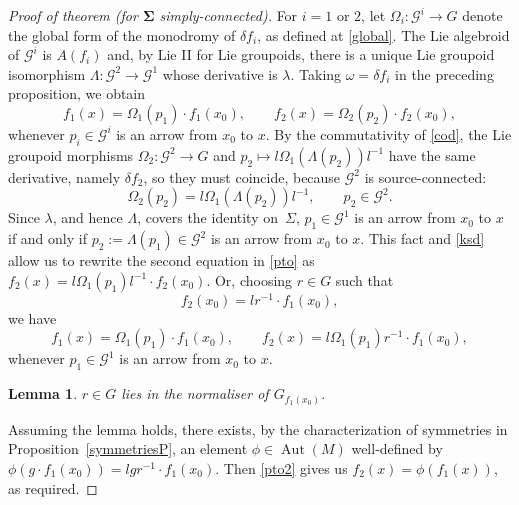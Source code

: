 \documentclass[10pt,a4paper]{amsart}
\numberwithin{equation}{section}
\newtheorem{Lemma}[Theorem]{Lemma}
\DeclareMathOperator{\automorphism}{Aut}
\begin{document}
\begin{proof}[Proof of theorem (for $\boldsymbol{\Sigma}$ simply-connected)]
For $i=1$ or $2$, let $\Omega_i \colon {\mathcal G}^i \rightarrow G$
denote the global form of the monodromy of $\delta f_i$, as defined at
\eqref{global}. The Lie algebroid of ${\mathcal G}^i$ is $A(f_i)$ and,
by Lie II for Lie groupoids, there is a unique Lie groupoid
isomorphism $\Lambda \colon {\mathcal G}^2\rightarrow {\mathcal G}^1$
whose derivative is $\lambda$. Taking $\omega = \delta f_i$ in the
preceding proposition, we obtain
\begin{equation} f_1(x) = \Omega_1(p_1) \cdot f_1(x_0),\qquad f_2(x) =
\Omega_2(p_2) \cdot f_2(x_0), \label{pto}
\end{equation} whenever $p_i \in {\mathcal G}^i$ is an arrow from
$x_0$ to $x$. By the commutativity of \eqref{cod}, the Lie groupoid
morphisms $\Omega_2 \colon {\mathcal G}^2 \rightarrow G$ and $p_2
\mapsto l \Omega_1({\Lambda}(p_2))l^{-1}$ have the same
derivative, namely $\delta f_2$, so they must coincide, because
${\mathcal G}^2$ is source-connected:
\begin{equation}
\Omega_2(p_2) = l\Omega_1({\Lambda}(p_2))l^{-1},\qquad
p_2 \in {\mathcal G}^2.\label{ksd}
\end{equation}
Since $\lambda$, and hence $\Lambda$, covers the
identity on~$\Sigma $, $p_1 \in {\mathcal G}^1$ is an arrow from $x_0$
to $x$ if and only if $p_2:=\Lambda(p_1)\in {\mathcal G}^2$ is an
arrow from $x_0$ to $x$. This fact and \eqref{ksd} allow us to rewrite
the second equation in \eqref{pto} as $f_2(x)=l \Omega_1(p_1)l^{-1}
\cdot f_2(x_0)$. Or, choosing $r \in G$ such that
\begin{equation} f_2(x_0)=lr^{-1}\cdot f_1(x_0),\label{five}
\end{equation} we have
\begin{equation} f_1(x) = \Omega_1(p_1) \cdot f_1(x_0),\qquad f_2(x) =
l\Omega_1(p_1)r^{-1} \cdot f_1(x_0), \label{pto2}
\end{equation} whenever $p_1 \in {\mathcal G}^1$ is an arrow from
$x_0$ to $x$.
\begin{Lemma} $r \in G$ lies in the normaliser of $G_{f_1(x_0)}$.
\end{Lemma}

Assuming the lemma holds, there exists, by the
characterization of symmetries in Proposition~\ref{symmetriesP}, an
element $\phi \in \automorphism(M)$ well-defined by $\phi(g \cdot
f_1(x_0))=lgr^{-1}\cdot f_1(x_0)$. Then \eqref{pto2} gives us
$f_2(x)=\phi(f_1(x))$, as required.
\end{proof}
%
\end{document}
